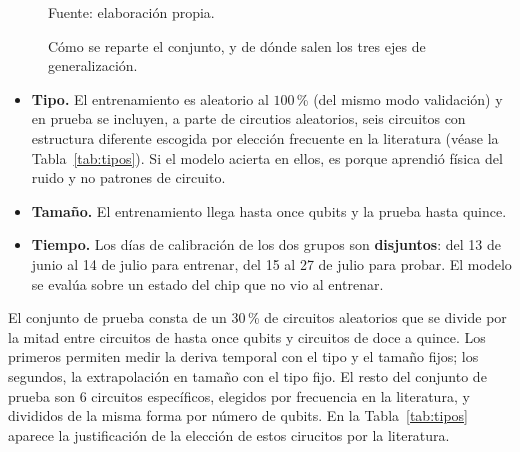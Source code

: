 \begin{figure}[htbp]
    \centering
    \caption{Cómo se reparte el conjunto, y de dónde salen los tres ejes de generalización.}
    \label{fig:tres_ejes}

    

    {\footnotesize Fuente: elaboración propia.}
\end{figure}

\begin{itemize}
    \item \textbf{Tipo.} El entrenamiento es aleatorio al $100$\,\% (del mismo modo validación) y en prueba se incluyen, a parte de circutios aleatorios, seis circuitos con estructura diferente escogida por elección frecuente en la literatura (véase la Tabla~\ref{tab:tipos}). Si el modelo acierta en ellos, es porque aprendió física del ruido y no patrones de circuito.
    \item \textbf{Tamaño.} El entrenamiento llega hasta once qubits y la prueba hasta quince.
    \item \textbf{Tiempo.} Los días de calibración de los dos grupos son \textbf{disjuntos}: del 13 de junio al 14 de julio para entrenar, del 15 al 27 de julio para probar. El modelo se evalúa sobre un estado del chip que no vio al entrenar.
\end{itemize}

El conjunto de prueba consta de un $30$\,\% de
circuitos aleatorios que se divide por la mitad
entre circuitos de hasta once qubits y circuitos de doce a quince. Los primeros permiten medir la deriva temporal con el tipo y el tamaño fijos; los segundos, la extrapolación en
tamaño con el tipo fijo. El resto del conjunto de prueba son 6 circuitos específicos, elegidos por frecuencia en la literatura, y divididos de la misma forma por número de qubits. En la Tabla~\ref{tab:tipos} aparece la justificación de la elección de estos cirucitos por la literatura.

